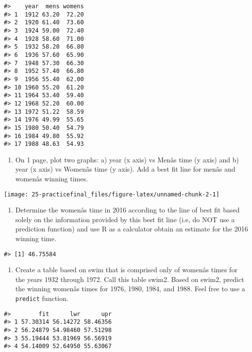 \documentclass[
]{book}
\providecommand{\tightlist}{%
  \setlength{\itemsep}{0pt}\setlength{\parskip}{0pt}}
\begin{document}
\begin{verbatim}
#>    year  mens womens
#> 1  1912 63.20  72.20
#> 2  1920 61.40  73.60
#> 3  1924 59.00  72.40
#> 4  1928 58.60  71.00
#> 5  1932 58.20  66.80
#> 6  1936 57.60  65.90
#> 7  1948 57.30  66.30
#> 8  1952 57.40  66.80
#> 9  1956 55.40  62.00
#> 10 1960 55.20  61.20
#> 11 1964 53.40  59.40
#> 12 1968 52.20  60.00
#> 13 1972 51.22  58.59
#> 14 1976 49.99  55.65
#> 15 1980 50.40  54.79
#> 16 1984 49.80  55.92
#> 17 1988 48.63  54.93
\end{verbatim}

\begin{enumerate}
\def\labelenumi{\arabic{enumi}.}
\setcounter{enumi}{1}
\tightlist
\item
  On 1 page, plot two graphs: a) year (x axis) vs Menâs time (y axis) and b) year (x axis) vs Womenâs time (y axis). Add a best fit line for menâs and womenâs winning times.
\end{enumerate}

\texttt{[image: 25-practicefinal\_files/figure-latex/unnamed-chunk-2-1]}

\begin{enumerate}
\def\labelenumi{\arabic{enumi}.}
\setcounter{enumi}{2}
\tightlist
\item
  Determine the womenâs time in 2016 according to the line of best fit based solely on the information provided by this best fit line (i.e, do NOT use a prediction function) and use R as a calculator obtain an estimate for the 2016 winning time.
\end{enumerate}

\begin{verbatim}
#> [1] 46.75584
\end{verbatim}

\begin{enumerate}
\def\labelenumi{\arabic{enumi}.}
\setcounter{enumi}{3}
\tightlist
\item
  Create a table based on swim that is comprised only of womenâs times for the years 1932 through 1972. Call this table swim2. Based on swim2, predict the winning womenâs times for 1976, 1980, 1984, and 1988. Feel free to use a \texttt{predict} function.
\end{enumerate}

\begin{verbatim}
#>        fit      lwr      upr
#> 1 57.30314 56.14272 58.46356
#> 2 56.24879 54.98460 57.51298
#> 3 55.19444 53.81969 56.56919
#> 4 54.14009 52.64950 55.63067
\end{verbatim}
\end{document}
